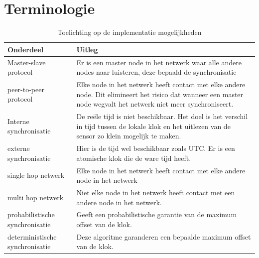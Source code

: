 \documentclass{article}
\begin{document}
\section{Terminologie}
\label{Terminologie}
\begin{table}
	\centering\caption{Toelichting op de implementatie mogelijkheden}
	\label{tab: implmentatie_mogelijkheden}
    \begin{tabular}{  l | p{5cm} }
    
    \textbf{Onderdeel} & \textbf{Uitleg} \\ \hline\hline
    Master-slave protocol & Er is een master node in het netwerk waar alle andere nodes naar luisteren, deze bepaald de synchronisatie \\ \hline
    peer-to-peer protocol &  Elke node in het netwerk heeft contact met elke andere node. Dit elimineert het risico dat wanneer een master node wegvalt het netwerk niet meer synchroniseert.\\ \hline
    Interne synchronisatie & De re\"{e}le tijd is niet beschikbaar. Het doel is het verschil in tijd tussen de lokale klok en het uitlezen van de sensor zo klein mogelijk te maken.\\
    \hline
    externe synchronisatie & Hier is de tijd wel beschikbaar zoals UTC. Er is een atomische klok die de ware tijd heeft.\\
    \hline
    single hop netwerk & Elke node in het netwerk heeft contact met elke andere node in het netwerk\\
    \hline
    multi hop netwerk & Niet elke node in het netwerk heeft contact met een andere node in het netwerk. \\
    \hline
    probabilistische synchronisatie & Geeft een probabilistische garantie van de maximum offset van de klok. \\
    \hline
    deterministische synchronisatie & Deze algoritme garanderen een bepaalde maximum offset van de klok. \\
    
    \end{tabular}
\end{table}
\end{document}

